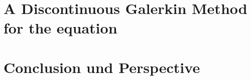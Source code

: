 \documentclass{template}
\begin{document}
\chapter{A Discontinuous Galerkin Method for the \MA equation}
\label{ch:ourMethod}


\chapter{Conclusion und Perspective}
\label{ch:conclusion}


\newpage
%
\newpage


\end{document}
